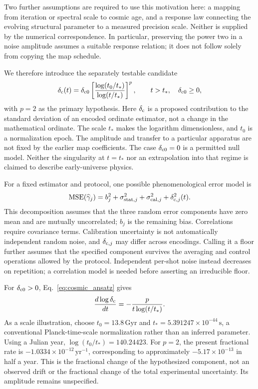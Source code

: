 Two further assumptions are required to use this motivation here: a mapping
from iteration or spectral scale to cosmic age, and a response law connecting
the evolving structural parameter to a measured precision scale. Neither is
supplied by the numerical correspondence. In particular, preserving the
power two in a noise amplitude assumes a suitable response relation; it
does not follow solely from copying the map schedule.

We therefore introduce the separately testable candidate
\begin{equation}
 \delta_{\rm c}(t)=\delta_{{\rm c}0}
 \left[\frac{\log(t_0/t_*)}{\log(t/t_*)}\right]^p,
 \qquad t>t_*,\quad \delta_{{\rm c}0}\geq0,
 \label{eq:cosmic_ansatz}
\end{equation}
with $p=2$ as the primary hypothesis. Here $\delta_{\rm c}$ is a proposed
contribution to the standard deviation of an encoded ordinate estimator,
not a change in the mathematical ordinate. The scale $t_*$ makes the logarithm
dimensionless, and $t_0$ is a normalization epoch. The amplitude and transfer
to a particular apparatus are not fixed by the earlier map coefficients.
The case $\delta_{{\rm c}0}=0$ is a permitted null model. Neither the
singularity at $t=t_*$ nor an extrapolation into that regime is claimed to
describe early-universe physics.

For a fixed estimator and protocol, one possible phenomenological error
model is
\begin{equation}
 \operatorname{MSE}(\widehat\gamma_j)
 =b_j^2+\sigma_{{\rm stat},j}^2+\sigma_{{\rm cal},j}^2
  +\delta_{{\rm c},j}^2(t).
 \label{eq:conditional_budget}
\end{equation}
This decomposition assumes that the three random error components have zero
mean and are mutually uncorrelated; $b_j$ is the remaining bias. Correlations
require covariance terms. Calibration uncertainty is not automatically
independent random noise, and $\delta_{{\rm c},j}$ may differ across encodings.
Calling it a floor further assumes that the specified component survives
the averaging and control operations allowed by the protocol. Independent
per-shot noise instead decreases on repetition; a correlation model is
needed before asserting an irreducible floor.

For $\delta_{{\rm c}0}>0$, Eq.~\eqref{eq:cosmic_ansatz} gives
\begin{equation}
 \frac{d\log\delta_{\rm c}}{dt}
 =-\frac{p}{t\log(t/t_*)}.
 \label{eq:cosmic_derivative}
\end{equation}
As a scale illustration, choose $t_0=13.8\,\mathrm{Gyr}$ and
$t_*=5.391247\times10^{-44}\,\mathrm{s}$, a conventional Planck-time-scale
normalization rather than an inferred parameter. Using a Julian year,
$\log(t_0/t_*)=140.24423$. For $p=2$, the present fractional rate is
$-1.0334\times10^{-12}\,\mathrm{yr}^{-1}$, corresponding to approximately
$-5.17\times10^{-13}$ in half a year. This is the fractional change of the
hypothesized component, not an observed drift or the fractional change of
the total experimental uncertainty. Its amplitude remains unspecified.

